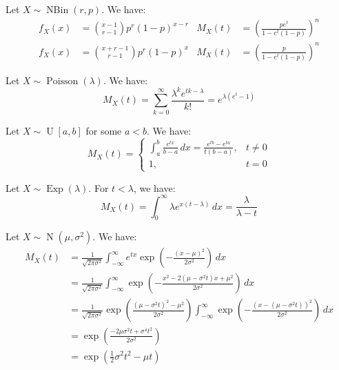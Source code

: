 \documentclass{huhtakm-template-book}
\DeclareMathOperator{\NBin}{NBin}
\DeclareMathOperator{\Poisson}{Poisson}
\DeclareMathOperator{\U}{U}
\DeclareMathOperator{\Exp}{Exp}
\DeclareMathOperator{\N}{N}
\begin{document}
\newpage
\begin{eg}
	Let $X\sim\NBin(r,p)$. We have:
	\begin{align*}
		f_{X}(x)&=\binom{x-1}{r-1}p^{r}(1-p)^{x-r} & M_{X}(t)&=\left(\frac{pe^{t}}{1-e^{t}(1-p)}\right)^{n}\\
		f_{X}(x)&=\binom{x+r-1}{r-1}p^{r}(1-p)^{x} & M_{X}(t)&=\left(\frac{p}{1-e^{t}(1-p)}\right)^{n}
	\end{align*}
\end{eg}
\begin{eg}
	Let $X\sim\Poisson(\lambda)$. We have:
	\begin{equation*}
		M_{X}(t)=\sum_{k=0}^{\infty}\frac{\lambda^{k}e^{tk-\lambda}}{k!}=e^{\lambda(e^{t}-1)}
	\end{equation*}
\end{eg}
\begin{eg}
	Let $X\sim\U[a,b]$ for some $a<b$. We have:
	\begin{equation*}
		M_{X}(t)=\begin{cases}
			\int_{a}^{b}\frac{e^{tx}}{b-a}\,dx=\frac{e^{tb}-e^{ta}}{t(b-a)}, &t\neq 0\\
			1, &t=0
		\end{cases}
	\end{equation*}
\end{eg}
\begin{eg}
	Let $X\sim\Exp(\lambda)$. For $t<\lambda$, we have:
	\begin{equation*}
		M_{X}(t)=\int_{0}^{\infty}\lambda e^{x(t-\lambda)}\,dx=\frac{\lambda}{\lambda-t}
	\end{equation*}
\end{eg}
\begin{eg}
	Let $X\sim\N(\mu,\sigma^{2})$. We have:
	\begin{align*}
		M_{X}(t)&=\frac{1}{\sqrt{2\pi\sigma^{2}}}\int_{-\infty}^{\infty}e^{tx}\exp\left(-\frac{(x-\mu)^{2}}{2\sigma^{2}}\right)\,dx\\
		&=\frac{1}{\sqrt{2\pi\sigma^{2}}}\int_{-\infty}^{\infty}\exp\left(-\frac{x^{2}-2(\mu-\sigma^{2}t)x+\mu^{2}}{2\sigma^{2}}\right)\,dx\\
		&=\frac{1}{\sqrt{2\pi\sigma^{2}}}\exp\left(\frac{(\mu-\sigma^{2}t)^{2}-\mu^{2}}{2\sigma^{2}}\right)\int_{-\infty}^{\infty}\exp\left(-\frac{(x-(\mu-\sigma^{2}t))^{2}}{2\sigma^{2}}\right)\,dx\\
		&=\exp\left(\frac{-2\mu\sigma^{2}t+\sigma^{4}t^{2}}{2\sigma^{2}}\right)\\
		&=\exp\left(\frac{1}{2}\sigma^{2}t^{2}-\mu t\right)
	\end{align*}	
\end{eg}
\end{document}
